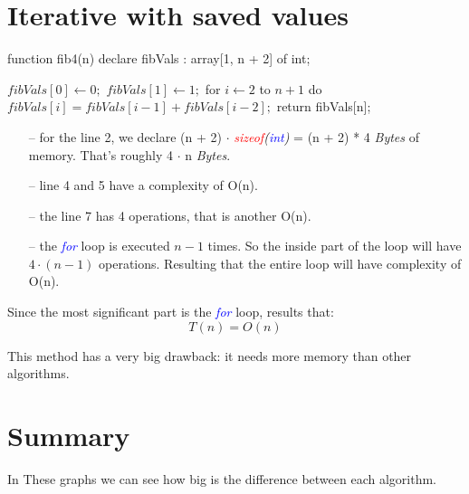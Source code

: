 \documentclass{article}
\begin{document}
	\newpage
	\section{Iterative with saved values}
		\begin{algorithm}[caption = {Iterative with saved values}, label = {Fibonacci4}]
function fib4(n)
	declare fibVals : array[1, n + 2] of int;

	$fibVals[0] \leftarrow 0;$
	$fibVals[1] \leftarrow 1;$
	for $i \leftarrow 2$ to $n + 1$ do
		$fibVals[i] = fibVals[i - 1] + fibVals[i - 2];$
	return fibVals[n];
		\end{algorithm}

		\begin{itemize}
			\item[--] for the line 2, we declare (n + 2) $\cdot$ \textit{\textcolor{red}{sizeof}(\textcolor{blue}{int})} = (n + 2) * 4 \textit{Bytes} of memory. That's roughly 4 $\cdot$ n \textit{Bytes}.
			\item[--] line 4 and 5 have a complexity of O(n).
			\item[--] the line 7 has 4 operations, that is another O(n).
			\item[--] the \textcolor{blue}{\textit{for}} loop is executed $n - 1$ times. So the inside part of the loop will have $4 \cdot (n - 1)$ operations. Resulting that the entire loop will have complexity of O(n).
		\end{itemize}
		\par Since the most significant part is the \textcolor{blue}{\textit{for}} loop, results that:
		\[
			T(n) = O(n)
		\]

		\begin{center}
			\par This method has a very big drawback: it needs more memory than other algorithms.
		\end{center}

	\newpage
	\section{Summary}

		In These graphs we can see how big is the difference between each algorithm.

	\newpage
\end{document}
